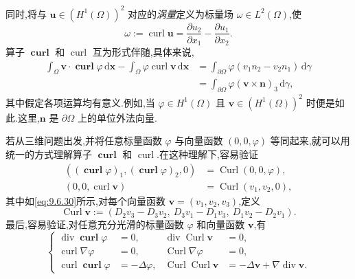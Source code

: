 同时,将与 \(\boldsymbol{u}\in(H^1(\Omega))^2\) 对应的\emph{涡量}定义为标量场 \(\omega\in L^2(\Omega)\),使
\begin{equation}\label{eq:10.4.2}
  \omega:=\operatorname{curl}\boldsymbol{u}
       =\frac{\partial u_2}{\partial x_1}-\frac{\partial u_1}{\partial x_2}.
\end{equation}
算子 \(\operatorname{\mathbf{curl}}\) 和 \(\operatorname{curl}\) 互为形式伴随,具体来说,
\begin{equation}\label{eq:10.4.3}
  \begin{aligned}
    \int_\Omega\boldsymbol{v}\cdot\operatorname{\mathbf{curl}}\varphi\,\mathrm d\boldsymbol{x}
      -\int_\Omega\varphi\operatorname{curl}\boldsymbol{v}\,\mathrm d\boldsymbol{x}
       &=\int_{\partial\Omega}\varphi(v_1n_2-v_2n_1)\,\mathrm d\gamma\\
       &=\int_{\partial\Omega}\varphi(\boldsymbol{v}\times\boldsymbol{n})_3\,\mathrm d\gamma,
  \end{aligned}
\end{equation}
其中假定各项运算均有意义.例如,当 \(\varphi\in H^1(\Omega)\) 且 \(\boldsymbol{v}\in(H^1(\Omega))^2\) 时便是如此.这里,\(\boldsymbol{n}\) 是 \(\partial\Omega\) 上的单位外法向量.

若从三维问题出发,并将任意标量函数 \(\varphi\) 与向量函数 \((0,0,\varphi)\) 等同起来,就可以用统一的方式理解算子 \(\operatorname{\mathbf{curl}}\) 和 \(\operatorname{curl}\).在这种理解下,容易验证
\[
  \begin{aligned}
    ((\operatorname{\mathbf{curl}}\varphi)_1,
         (\operatorname{\mathbf{curl}}\varphi)_2,0)
        &=\operatorname{Curl}(0,0,\varphi),\\
    (0,0,\operatorname{curl}\boldsymbol{v})&=\operatorname{Curl}(v_1,v_2,0),
  \end{aligned}
\]
其中如\eqref{eq:9.6.30}所示,对每个向量函数 \(\boldsymbol{v}=(v_1,v_2,v_3)\),定义
\[
  \operatorname{Curl}\boldsymbol{v}
      :=(D_2v_3-D_3v_2,\ D_3v_1-D_1v_3,\ D_1v_2-D_2v_1).
\]
最后,容易验证,对任意充分光滑的标量函数 \(\varphi\) 和向量函数 \(\boldsymbol{v}\),有
\begin{equation}\label{eq:10.4.4}
  \left\{
  \begin{aligned}
    \operatorname{div}\operatorname{\mathbf{curl}}\varphi&=0,\quad&
        \operatorname{div}\operatorname{Curl}\boldsymbol{v}&=0,\\
    \operatorname{curl}\nabla\varphi&=0,&\operatorname{Curl}\nabla\varphi&=0,\\
    \operatorname{curl}\operatorname{\mathbf{curl}}\varphi&=-\Delta\varphi,&
       \operatorname{Curl}\operatorname{Curl}\boldsymbol{v}
        &=-\Delta\boldsymbol{v}+\nabla\operatorname{div}\boldsymbol{v}.
  \end{aligned}
  \right.
\end{equation}

